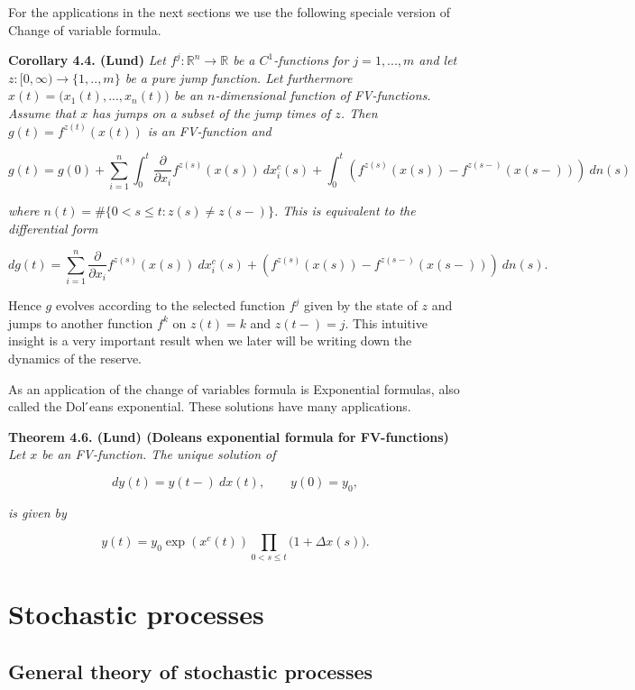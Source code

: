 \documentclass[a4paper,12pt,openany]{book}
\begin{document}
For the applications in the next sections we use the following speciale version of Change of variable formula.

\textbf{Corollary 4.4. (Lund)} \emph{Let \(f^j : \mathbb R^n\to\mathbb R\) be a \(C^1\)-functions for \(j=1,...,m\) and let \(z : [0,\infty) \to \{1,..,m\}\) be a pure jump function. Let furthermore \(x(t)=\big(x_1(t),...,x_n(t)\big)\) be an \(n\)-dimensional function of FV-functions. Assume that \(x\) has jumps on a subset of the jump times of \(z\). Then \(g(t)=f^{z(t)}(x(t))\) is an FV-function and}

\[
g(t)=g(0)+\sum_{i=1}^n\int_0^t\frac{\partial}{\partial x_i}f^{z(s)}(x(s))\ dx_i^c(s)+\int_0^t\left(f^{z(s)}(x(s))-f^{z(s-)}(x(s-))\right)\ dn(s)
\]

\emph{where \(n(t)=\#\{0<s\le t: z(s)\ne z(s-)\}\). This is equivalent to the differential form}

\[
dg(t)=\sum_{i=1}^n\frac{\partial}{\partial x_i}f^{z(s)}(x(s))\ dx_i^c(s)+\left(f^{z(s)}(x(s))-f^{z(s-)}(x(s-))\right)\ dn(s).
\]

Hence \(g\) evolves according to the selected function \(f^j\) given by the state of \(z\) and jumps to another function \(f^k\) on \(z(t)=k\) and \(z(t-)=j\). This intuitive insight is a very important result when we later will be writing down the dynamics of the reserve.

As an application of the change of variables formula is Exponential formulas, also called the Dol ́eans exponential. These solutions have many applications.

\textbf{Theorem 4.6. (Lund) (Doleans exponential formula for FV-functions)} \emph{Let \(x\) be an FV-function. The unique solution of}

\[
dy(t)=y(t-)\ dx(t),\qquad y(0)=y_0,
\]

\emph{is given by}

\[
y(t)=y_0\exp(x^c(t))\prod_{0<s\le t}\big(1+\Delta x(s)\big).
\]

\hypertarget{stochastic-processes}{%
\section{Stochastic processes}\label{stochastic-processes}}

\hypertarget{general-theory-of-stochastic-processes}{%
\subsection{General theory of stochastic processes}\label{general-theory-of-stochastic-processes}}
\end{document}
